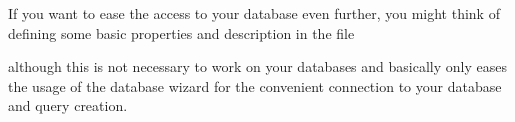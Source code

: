 If you want to ease the access to your database even further, you might think of 
defining some basic properties and description in the file
\begin{center} 
\end{center}
although this is not necessary to work on your databases and basically only eases
the usage of the database wizard for the convenient connection to your database
and query creation.
